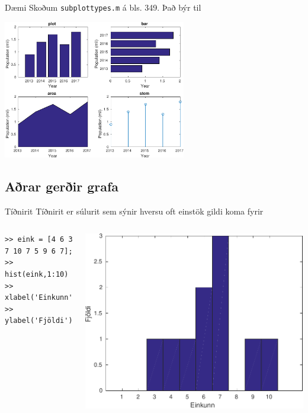 \documentclass{beamer}
\begin{document}
\begin{frame}{Dæmi}
\vspace{1cm}
Skoðum \texttt{subplottypes.m} á bls. 349. Það býr til

\begin{center}
\includegraphics[width=0.6\textwidth]{Pics/plottypes.pdf}
\end{center}
\end{frame}

\subsection{Aðrar gerðir grafa}

\begin{frame}[fragile]{Tíðnirit}
Tíðnirit er súlurit sem sýnir hversu oft einstök gildi koma fyrir
\begin{columns}
\begin{verbatim}
>> eink = [4 6 3 7 10 7 5 9 6 7];
>> hist(eink,1:10)
>> xlabel('Einkunn')
>> ylabel('Fjöldi')
\end{verbatim}

\includegraphics[width=\linewidth]{Pics/hist}
\end{columns}

\end{frame}
\end{document}
